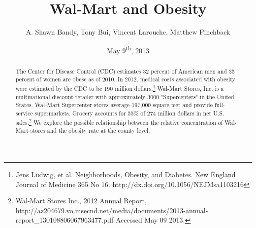 \documentclass[letterpaper, **24pt**]{article}
\begin{document}
\title{Wal-Mart and Obesity}
\author{A. Shawn Bandy, Tony Bui, Vincent Larouche, Matthew Pinchback}
\date{May 9\textsuperscript{th}, 2013}
\maketitle
\fontsize{12bp}{14bp}\selectfont

\begin{abstract}
The Center for Disease Control (CDC) estimates 32 percent of American men and 35 percent of women are obese as of 2010.  In 2012, medical costs associated with obesity were estimated by the CDC to be 190 million dollars.\footnote{Jens Ludwig, et al. Neighborhoods, Obesity, and Diabetes. New England Journal of Medicine 365 No 16. http://dx.doi.org/10.1056/NEJMsa1103216}  Wal-Mart Stores, Inc. is a multinational discount retailer with approximately 3000 "Supercenters" in the United States.   Wal-Mart Supercenter stores average 197,000 square feet and provide full-service supermarkets.  Grocery accounts for 55\% of 274 million dollars in net U.S. sales.\footnote{Wal-Mart Stores Inc., 2012 Annual Report, http://az204679.vo.msecnd.net/media/documents/2013-annual-report_130108806067963477.pdf Accessed May 09 2013. }  We explore the possible relationship between the relative concentration of Wal-Mart stores and the obesity rate at the county level.
\end{abstract}
\newpage
\end{document}
